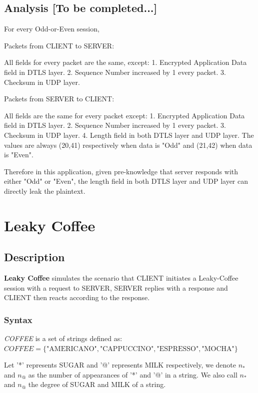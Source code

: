 \subsection{Analysis [To be completed...]}

For every Odd-or-Even session, 

Packets from CLIENT to SERVER:

All fields for every packet are the same, except:
1. Encrypted Application Data field in DTLS layer.
2. Sequence Number increased by 1 every packet.
3. Checksum in UDP layer.

Packets from SERVER to CLIENT:

All fields are the same for every packet except:
1. Encrypted Application Data field in DTLS layer.
2. Sequence Number increased by 1 every packet.
3. Checksum in UDP layer.
4. Length field in both DTLS layer and UDP layer. The values are always (20,41) respectively when data is "Odd" and (21,42) when data is "Even".

Therefore in this application, given pre-knowledge that server responds with either "Odd" or "Even", the length field in both DTLS layer and UDP layer can directly leak the plaintext. 

\section{Leaky Coffee}

\subsection{Description}
\textbf{Leaky Coffee} simulates the scenario that CLIENT initiates a Leaky-Coffee session with a request to SERVER, SERVER replies with a response and CLIENT then reacts according to the response.

\subsubsection{Syntax}
\begin{definition}
\textit{COFFEE} is a set of strings defined as:\\
 $COFFEE = \{  {\text{"AMERICANO"}}, \text{"CAPPUCCINO"}, \text{"ESPRESSO"}, \text{"MOCHA"}\}$
\end{definition}

\begin{definition}
Let '*' represents SUGAR and '@' represents MILK respectively, we denote $n_*$ and $n_@$ as the number of appearances of '*' and '@' in a string. We also call $n_*$ and $n_@$ the degree of SUGAR and MILK of a string.
\end{definition}

